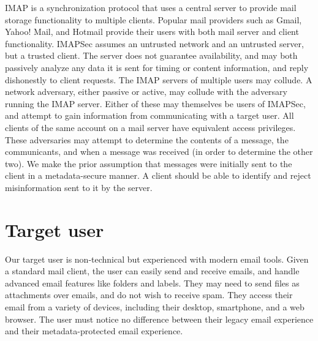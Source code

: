 \documentclass[pageno]{jpaper}
\newcommand{\project}{IMAPSec }
\newcommand{\projectnospace}{IMAPSec}
\begin{document}
IMAP is a synchronization protocol that uses a central server to provide mail storage functionality to multiple clients. Popular mail providers such as Gmail, Yahoo! Mail, and Hotmail provide their users with both mail server and client functionality. \project assumes an untrusted network and an untrusted server, but a trusted client. The server does not guarantee availability, and may both passively analyze any data it is sent for timing or content information, and reply dishonestly to client requests. The IMAP servers of multiple users may collude. A network adversary, either passive or active, may collude with the adversary running the IMAP server. Either of these may themselves be users of \projectnospace, and attempt to gain information from communicating with a target user. All clients of the same account on a mail server have equivalent access privileges. These adversaries may attempt to determine the contents of a message, the communicants, and when a message was received (in order to determine the other two). We make the prior assumption that messages were initially sent to the client in a metadata-secure manner. A client should be able to identify and reject misinformation sent to it by the server.


\label{targetuser}
\section{Target user}

Our target user is non-technical but experienced with modern email tools. Given a standard mail client, the user can easily send and receive emails, and handle advanced email features like folders and labels. They may need to send files as attachments over emails, and do not wish to receive spam. They access their email from a variety of devices, including their desktop, smartphone, and a web browser. The user must notice no difference between their legacy email experience and their metadata-protected email experience.
\end{document}

